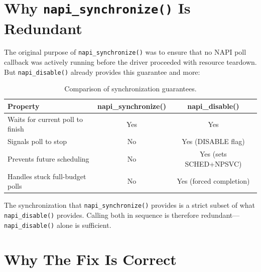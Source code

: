 \documentclass[11pt,a4paper,openany]{book}
\newcommand{\func}[1]{\texttt{#1()}}
\begin{document}
\section{Why \texttt{napi\_synchronize()} Is Redundant}

The original purpose of \func{napi\_synchronize} was to ensure that no
NAPI poll callback was actively running before the driver proceeded
with resource teardown.  But \func{napi\_disable} already provides
this guarantee and more:

\begin{table}[H]
\centering
\begin{tabular}{lcc}
\toprule
\textbf{Property} & \textbf{napi\_synchronize()} & \textbf{napi\_disable()} \\
\midrule
Waits for current poll to finish  & Yes & Yes \\
Signals poll to stop              & No  & Yes (DISABLE flag) \\
Prevents future scheduling        & No  & Yes (sets SCHED+NPSVC) \\
Handles stuck full-budget polls   & No  & Yes (forced completion) \\
\bottomrule
\end{tabular}
\caption{Comparison of synchronization guarantees.}
\end{table}

The synchronization that \func{napi\_synchronize} provides is a strict
subset of what \func{napi\_disable} provides.  Calling both in sequence
is therefore redundant---\func{napi\_disable} alone is sufficient.

\section{Why The Fix Is Correct}
\end{document}
